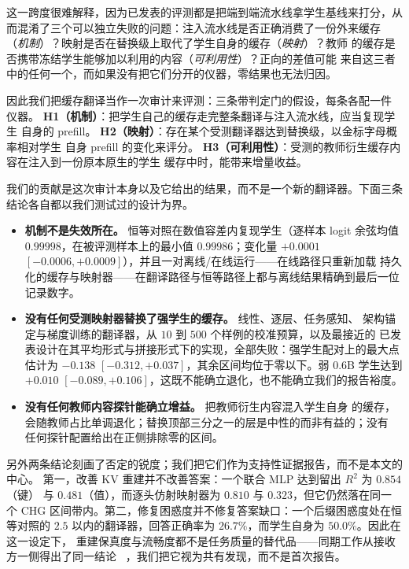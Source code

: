 \documentclass[10pt,a4paper,fontset=fandol]{ctexart}
\newcommand{\kv}{\ensuremath{\mathrm{KV}}}
\begin{document}
这一跨度很难解释，因为已发表的评测都是把端到端流水线拿学生基线来打分，从
而混淆了三个可以独立失败的问题：注入流水线是否正确消费了一份外来缓存
（\emph{机制}）？映射是否在替换级上取代了学生自身的缓存（\emph{映射}）？教师
的缓存是否携带冻结学生能够加以利用的内容（\emph{可利用性}）？正向的差值可能
来自这三者中的任何一个，而如果没有把它们分开的仪器，零结果也无法归因。

因此我们把缓存翻译当作一次审计来评测：三条带判定门的假设，每条各配一件
仪器。
\textbf{H1（机制）}：把学生自己的缓存走完整条翻译与注入流水线，应当复现学生
自身的 prefill。
\textbf{H2（映射）}：存在某个受测翻译器达到替换级，以金标字母概率相对学生
自身 prefill 的变化来评分。
\textbf{H3（可利用性）}：受测的教师衍生缓存内容在注入到一份原本原生的学生
缓存中时，能带来增量收益。

我们的贡献是这次审计本身以及它给出的结果，而不是一个新的翻译器。下面三条
结论各自都以我们测试过的设计为界。

\begin{itemize}
\item \textbf{机制不是失效所在。} 恒等对照在数值容差内复现学生（逐样本
logit 余弦均值 $0.99998$，在被评测样本上的最小值 $0.99986$；变化量
$+0.0001$ $[-0.0006,+0.0009]$），并且一对离线/在线运行——在线路径只重新加载
持久化的缓存与映射器——在翻译路径与恒等路径上都与离线结果精确到最后一位
记录数字。
\item \textbf{没有任何受测映射器替换了强学生的缓存。} 线性、逐层、任务感知、
架构锚定与梯度训练的翻译器，从 $10$ 到 $500$ 个样例的校准预算，以及最接近的
已发表设计在其平均形式与拼接形式下的实现，全部失败：强学生配对上的最大点
估计为 $-0.138$ $[-0.312,+0.037]$，其余区间均位于零以下。弱 $0.6$B 学生达到
$+0.010$ $[-0.089,+0.106]$，这既不能确立退化，也不能确立我们的报告裕度。
\item \textbf{没有任何教师内容探针能确立增益。} 把教师衍生内容混入学生自身
的缓存，会随教师占比单调退化；替换顶部三分之一的层是中性的而非有益的；没有
任何探针配置给出在正侧排除零的区间。
\end{itemize}

另外两条结论刻画了否定的锐度；我们把它们作为支持性证据报告，而不是本文的中心。
第一，改善 \kv{} 重建并不改善答案：一个联合 MLP 达到留出 $R^2$ 为 $0.854$（键）
与 $0.481$（值），而逐头仿射映射器为 $0.810$ 与 $0.323$，但它仍然落在同一个 CHG
区间带内。第二，修复困惑度并不修复答案缺口：一个后缀困惑度处在恒等对照的 $2.5$
以内的翻译器，回答正确率为 $26.7\%$，而学生自身为 $50.0\%$。因此在这一设定下，
重建保真度与流畅度都不是任务质量的替代品——同期工作从接收方一侧得出了同一结论
~\citep{cachelink2026}，我们把它视为共有发现，而不是首次报告。
\end{document}
